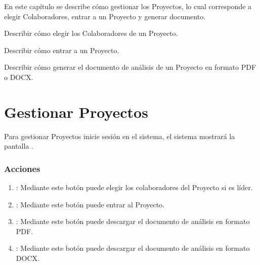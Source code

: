 
En este capítulo se describe cómo gestionar los Proyectos, lo cual corresponde a elegir Colaboradores, entrar a un Proyecto y generar documento.\\


\begin{objetivos}
	\item Describir cómo elegir los Colaboradores de un Proyecto.
	\item Describir cómo entrar a un Proyecto.
	\item Describir cómo generar el documento de análisis de un Proyecto en formato PDF o DOCX.
\end{objetivos}



\section{Gestionar Proyectos}

Para gestionar Proyectos inicie sesión en el sistema, el sistema mostrará la pantalla . 


\subsubsection{Acciones}

\begin{enumerate}
	\item {}: Mediante este botón puede elegir los colaboradores del Proyecto si es líder.
	\item {}: Mediante este botón puede entrar al Proyecto.
	\item {}: Mediante este botón puede descargar el documento de análisis en formato PDF.
	\item {}: Mediante este botón puede descargar el documento de análisis en formato DOCX.
\end{enumerate}



